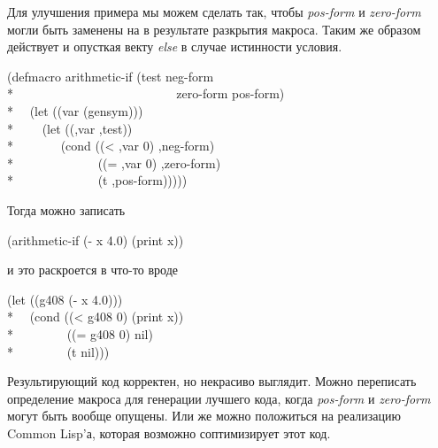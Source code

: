 \begin{defmac}
Для улучшения примера мы можем сделать так, чтобы \emph{pos-form} и
\emph{zero-form} могли быть заменены на {\nil} в результате разкрытия макроса.
Таким же образом действует и  опусткая векту \emph{else} в случае
истинности условия.
\begin{lisp}
(defmacro arithmetic-if (test neg-form \\*
~~~~~~~~~~~~~~~~~~~~~~~~~ zero-form pos-form) \\*
~~(let ((var (gensym))) \\*
~~~~{\Xbq}(let ((,var ,test)) \\*
~~~~~~~(cond ((< ,var 0) ,neg-form) \\*
~~~~~~~~~~~~~((= ,var 0) ,zero-form) \\*
~~~~~~~~~~~~~(t ,pos-form)))))
\end{lisp}
Тогда можно записать
\begin{lisp}
(arithmetic-if (- x 4.0) (print x))
\end{lisp}
и это раскроется в что-то вроде
\begin{lisp}
(let ((g408 (- x 4.0))) \\*
~~(cond ((< g408 0) (print x)) \\*
~~~~~~~~((= g408 0) nil) \\*
~~~~~~~~(t nil)))
\end{lisp}
Результирующий код корректен, но некрасиво выглядит.
Можно переписать определение макроса для генерации лучшего кода, когда
\emph{pos-form} и \emph{zero-form} могут быть вообще опущены.
Или же можно положиться на реализацию Common Lisp'а, которая возможно
соптимизирует этот код.


\end{defmac}
